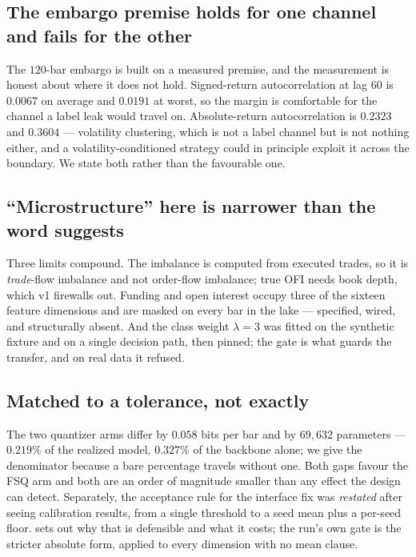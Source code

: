 \subsection{The embargo premise holds for one channel and fails for the other}
\label{sec:lim-embargo}

The $120$-bar embargo is built on a measured premise, and the measurement is honest about where it
does not hold. Signed-return autocorrelation at lag $60$ is $0.0067$ on average and $0.0191$ at
worst, so the margin is comfortable for the channel a label leak would travel on. Absolute-return
autocorrelation is $0.2323$ and $0.3604$ --- volatility clustering, which is not a label channel
but is not nothing either, and a volatility-conditioned strategy could in principle exploit it
across the boundary. We state both rather than the favourable one.

\subsection{``Microstructure'' here is narrower than the word suggests}
\label{sec:lim-micro}

Three limits compound. The imbalance is computed from executed trades, so it is \emph{trade}-flow
imbalance and not order-flow imbalance; true OFI needs book depth, which v1 firewalls out.
Funding and open interest occupy three of the sixteen feature dimensions and are masked on every
bar in the lake --- specified, wired, and structurally absent. And the class weight $\lambda = 3$
was fitted on the synthetic fixture and on a single decision path, then pinned; the gate is what
guards the transfer, and on real data it refused.

\subsection{Matched to a tolerance, not exactly}
\label{sec:lim-matching}

The two quantizer arms differ by $0.058$ bits per bar and by $69{,}632$ parameters --- $0.219\%$ of
the realized model, $0.327\%$ of the backbone alone; we give the denominator because a bare
percentage travels without one. Both gaps favour the FSQ arm and both are an order of magnitude
smaller than any effect the design can detect. Separately, the acceptance rule for the interface
fix was \emph{restated} after seeing calibration results, from a single threshold to a seed mean
plus a per-seed floor.  sets out why that is defensible and what it costs; the
run's own gate is the stricter absolute form, applied to every dimension with no mean clause.

